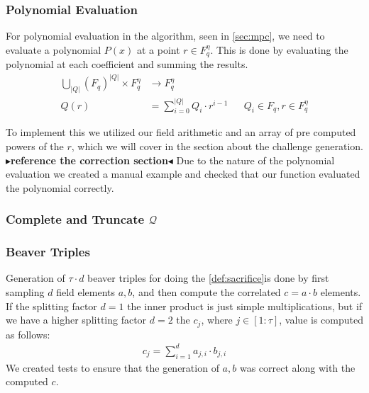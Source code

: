 \documentclass[11pt]{report}
\theoremstyle{definition}
\theoremstyle{plain}
\newcommand{\todo}[1]{{\color[rgb]{.5,0,0}\textbf{$\blacktriangleright$#1$\blacktriangleleft$}}}
\begin{document}
\subsubsection{Polynomial Evaluation}
For polynomial evaluation in the algorithm, seen in \autoref{sec:mpc}, we need to evaluate a polynomial $P(x)$ at a point $r \in F_q^\eta$. This is done by evaluating the polynomial at each coefficient and summing the results.
\begin{align}
  \textstyle\bigcup_{|Q|}(F_q)^{|Q|} \times F_q^\eta & \rightarrow F_q^\eta                 \nonumber                                                    \\
  Q(r)                                               & = \textstyle\sum_{i=0}^{|Q|} Q_i \cdot r^{i-1} &  & Q_i \in F_q, r \in F_q^\eta\label{eq:mpcpoly}
\end{align}

To implement this we utilized our field arithmetic and an array of pre computed powers of the $r$, which we will cover in the section about the challenge generation. \todo{reference the correction section}
Due to the nature of the polynomial evaluation we created a manual example and checked that our function evaluated the polynomial correctly.

\subsubsection{Complete and Truncate $\mathcal{Q}$}


\subsubsection{Beaver Triples}
Generation of $\tau \cdot d$ beaver triples for doing the \autoref{def:sacrifice}is done by first sampling $d$ field elements $a,b$, and then compute the correlated $c = a \cdot b$ elements. If the splitting factor $d=1$ the inner product is just simple multiplications, but if we have a higher splitting factor $d=2$ the $c_j$, where $j \in [1:\tau]$, value is computed as follows:
\begin{align}
  c_j = \sum_{i=1}^{d} a_{ j,i } \cdot b_{j,i}
\end{align}
We created tests to ensure that the generation of $a,b$ was correct along with the computed $c$.
\end{document}
